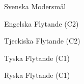 

\begin{cvskills}

\cvskill
  {Svenska} %
  {Modersmål} %

\cvskill
  {Engelska} %
  {Flytande (C2)} %

\cvskill
  {Tjeckiska} %
  {Flytande (C2)} %

\cvskill
  {Tyska} %
  {Flytande (C1)} %

\cvskill
  {Ryska} %
  {Flytande (C1)} %



\end{cvskills}
